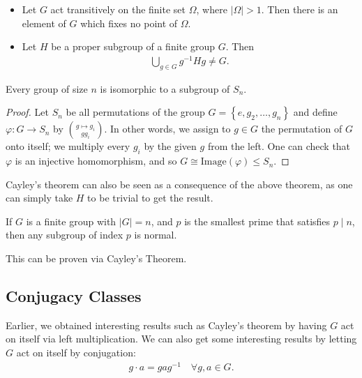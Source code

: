 \documentclass{memoir}
\begin{document}
\begin{cor}
\begin{itemize}
	\item Let \(G\) act transitively on the finite set \(\Omega\), where \(\left| \Omega \right| >1\). Then there is an element of \(G\) which fixes no point of \(\Omega\).
	\item Let \(H\) be a proper subgroup of a finite group \(G\). Then
		\begin{align*}
			\bigcup_{g \in G} g^{-1}Hg \neq G.
		\end{align*}
\end{itemize}
\end{cor}

\begin{thm}
	Every group of size \(n\) is isomorphic to a subgroup of \(S_n\).
\end{thm}
\begin{proof}
	Let \(S_n\) be all permutations of the group \(G = \left\{ e,g_2,\ldots,g_n \right\} \) and define \(\varphi:G\to S_n\) by \(g \mapsto {g_i}\choose{gg_i}\). In other words, we assign to \(g\in G\) the permutation of \(G\) onto itself; we multiply every \(g_i\) by the given \(g\) from the left. One can check that \(\varphi\) is an injective homomorphism, and so \(G \cong \textrm{Image}(\varphi)\leq S_n\).
\end{proof}

Cayley's theorem can also be seen as a consequence of the above theorem, as one can simply take \(H\) to be trivial to get the result.
\begin{prop}
	If \(G\) is a finite group with \(\left| G \right| =n\), and \(p\) is the smallest prime that satisfies \(p\mid n\), then any subgroup of index \(p\) is normal.
\end{prop}
This can be proven via Cayley's Theorem.

\subsection{Conjugacy Classes}
\label{sub:conjugacy_classes}

Earlier, we obtained interesting results such as Cayley's theorem by having \(G\) act on itself via left multiplication. We can also get some interesting results by letting \(G\) act on itself by conjugation:
\begin{align*}
	g \cdot a = gag^{-1} \quad \forall g,a \in G.
\end{align*}
\end{document}
